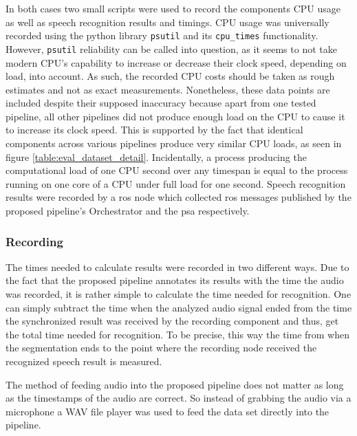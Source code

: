 In both cases two small scripts were used to record the components CPU usage as well as speech recognition results and timings.
CPU usage was universally recorded using the python library \texttt{psutil} \cite{psutil} and its \texttt{cpu\_times} functionality.
However, \texttt{psutil} reliability can be called into question, as it seems to not take modern CPU's capability to increase or decrease their clock speed, depending on load, into account.
As such, the recorded CPU costs should be taken as rough estimates and not as exact measurements.
Nonetheless, these data points are included despite their supposed inaccuracy because apart from one tested pipeline, all other pipelines did not produce enough load on the CPU to cause it to increase its clock speed.
This is supported by the fact that identical components across various pipelines produce very similar CPU loads, as seen in figure 
\ref{table:eval_dataset_detail}.
Incidentally, a process producing the computational load of one CPU second over any timespan is equal to the process running on one core of a CPU under full load for one second.
Speech recognition results were recorded by a \gls{ros} node which collected \gls{ros} messages published by the proposed pipeline's Orchestrator and the \gls{psa} respectively.

\subsubsection{Recording}

The times needed to calculate results were recorded in two different ways.
Due to the fact that the proposed pipeline annotates its results with the time the audio was recorded, it is rather simple to calculate the time needed for recognition.
One can simply subtract the time when the analyzed audio signal ended from the time the synchronized result was received by the recording component and thus, get the total time needed for recognition.
To be precise, this way the time from when the segmentation ends to the point where the recording node received the recognized speech result is measured.

The method of feeding audio into the proposed pipeline does not matter as long as the timestamps of the audio are correct.
So instead of grabbing the audio via a microphone a WAV file player was used to feed the data set directly into the pipeline.

